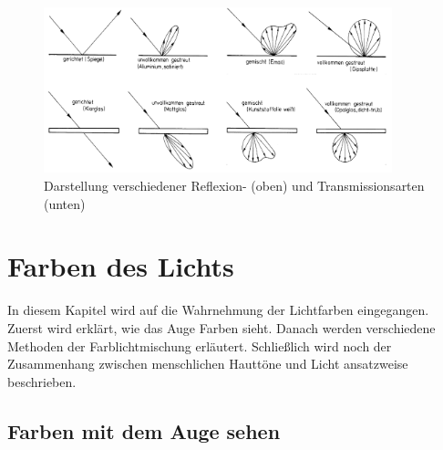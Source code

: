 \begin{figure}[H]     %
\centering
\includegraphics[width=0.9\textwidth]{bilder/reftrans} 
\caption {Darstellung verschiedener Reflexion- (oben) und Transmissionsarten (unten) \protect\footnotemark}\label{b_reftrans}
\end{figure}


\chapter{Farben des Lichts}

In diesem Kapitel wird auf die Wahrnehmung der Lichtfarben eingegangen. Zuerst wird erklärt, wie das Auge Farben sieht. Danach werden verschiedene Methoden der Farblichtmischung erläutert. Schließlich wird noch der Zusammenhang zwischen menschlichen Hauttöne und Licht ansatzweise beschrieben.  

\section{Farben mit dem Auge sehen} \label{sec_auge}


